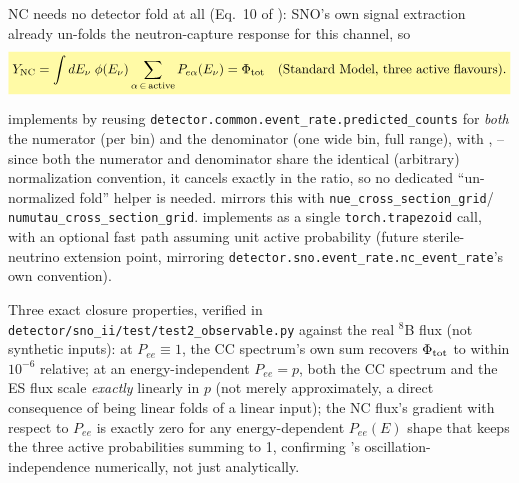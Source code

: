 \begin{theorybox}
NC needs no detector fold at all (Eq.~10 of \cite{Aharmim2005SaltPhase}):
SNO's own signal extraction already un-folds the neutron-capture response
for this channel, so
\begin{equation}
  \keyresult{Y_{\rm NC} = \int dE_\nu\;\phi(E_\nu)\sum_{\alpha\,\in\,{\rm active}} P_{e\alpha}(E_\nu)
    = \Phi_{\rm tot}\quad\text{(Standard Model, three active flavours).}}
  \label{eq:nc-equivalent-flux}
\end{equation}
\end{theorybox}

\begin{implbox}
 implements  by
reusing \texttt{detector.common.event\_rate.predicted\_counts} for
\emph{both} the numerator (per bin) and the denominator (one wide bin, full
range), with ,  -- since both the
numerator and denominator share the identical (arbitrary) normalization
convention, it cancels exactly in the ratio, so no dedicated
``un-normalized fold'' helper is needed. 
mirrors this with \texttt{nue\_cross\_section\_grid}/
\texttt{numutau\_cross\_section\_grid}.  implements 
as a single \texttt{torch.trapezoid} call, with an optional
 fast path assuming unit active probability
(future sterile-neutrino extension point, mirroring
\texttt{detector.sno.event\_rate.nc\_event\_rate}'s own convention).
\end{implbox}

\begin{resultbox}
Three exact closure properties, verified in
\texttt{detector/sno\_ii/test/test2\_observable.py} against the real
$^8$B flux (not synthetic inputs): at $P_{ee}\equiv1$, the CC spectrum's
own sum recovers $\Phi_{\rm tot}$ to within $10^{-6}$ relative; at an
energy-independent $P_{ee}=p$, both the CC spectrum and the ES flux scale
\emph{exactly} linearly in $p$ (not merely approximately, a direct
consequence of 
being linear folds of a linear input); the NC flux's gradient with respect
to $P_{ee}$ is exactly zero for any energy-dependent $P_{ee}(E)$ shape that
keeps the three active probabilities summing to 1, confirming
's oscillation-independence numerically,
not just analytically.
\end{resultbox}


